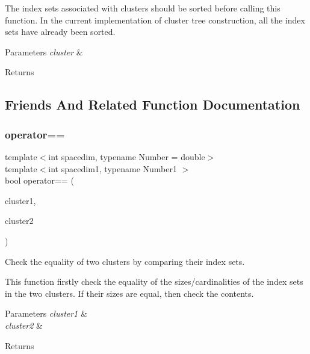 \begin{DoxyDescription}
\item[Note ]The index sets associated with clusters should be sorted before calling this function. In the current implementation of cluster tree construction, all the index sets have already been sorted. 
\end{DoxyDescription}
\begin{DoxyParams}{Parameters}
{\em cluster} & \\
\hline
\end{DoxyParams}
\begin{DoxyReturn}{Returns}

\end{DoxyReturn}


\subsection{Friends And Related Function Documentation}
\mbox{\label{classCluster_a930aea4a53249004429d28f9631e495f}} 
\subsubsection{\texorpdfstring{operator==}{operator==}}
{\footnotesize\ttfamily template$<$int spacedim, typename Number = double$>$ \\
template$<$int spacedim1, typename Number1 $>$ \\
bool operator== (\begin{DoxyParamCaption}\item[{const \hyperlink{classCluster}{Cluster}$<$ spacedim1, Number1 $>$ \&}]{cluster1,  }\item[{const \hyperlink{classCluster}{Cluster}$<$ spacedim1, Number1 $>$ \&}]{cluster2 }\end{DoxyParamCaption})\hspace{0.3cm}{\ttfamily [friend]}}

Check the equality of two clusters by comparing their index sets.

This function firstly check the equality of the sizes/cardinalities of the index sets in the two clusters. If their sizes are equal, then check the contents.


\begin{DoxyParams}{Parameters}
{\em cluster1} & \\
\hline
{\em cluster2} & \\
\hline
\end{DoxyParams}
\begin{DoxyReturn}{Returns}

\end{DoxyReturn}


